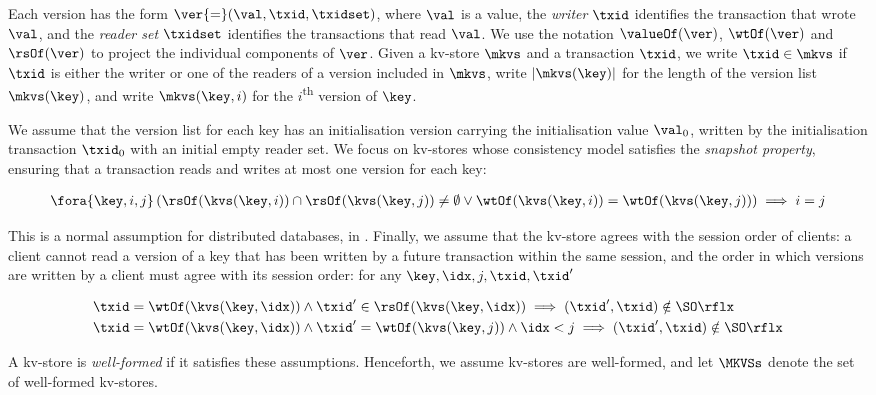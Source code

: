 Each version has the form 
\(\ver {=} (\val, \txid, \txidset)\), where \(\val\) is
a value, the \emph{writer} \(\txid\) identifies the transaction that
wrote \(\val\),  and the \emph{reader set} \(\txidset\) identifies the
transactions that read \(\val\). We use the notation 
\(\valueOf(\ver)\),
\(\wtOf(\ver)\) and \(\rsOf(\ver)\) to project
the individual components of \(\ver\).
Given a kv-store \(\mkvs\) and a transaction \(\txid\), we write 
\(\txid \in \mkvs\) if \(\txid\) is either the writer or 
one of the readers of a version included in \(\mkvs\), 
write \(\lvert \mkvs(\key) \rvert\) for the length of the version
list \(\mkvs(\key)\),
and write \(\mkvs(\key, i)\) for the \(i\)\textsuperscript{th} version of \(\key\).

We assume that the version list for each key has an initialisation version 
carrying the initialisation value \(\val_0\),  written by the 
initialisation transaction \(\txid_0\) with an initial empty reader set.
We focus on kv-stores whose consistency model satisfies the
\emph{snapshot property}, ensuring that
a transaction reads and writes at most one version for each key:

\SpaceAboveMath
\begin{align}
\fora{\key, i, j} 
\left( \rsOf(\kvs(\key, i)) \cap \rsOf(\kvs(\key, j)) \neq \emptyset \lor
\wtOf(\kvs(\key, i)) = \wtOf(\kvs(\key, j)) \right)
\implies i = j  
\label{equ:kvs-wf-txid-snapshot-property} 
\end{align}
\SpaceBelowMath

\noindent 
This is a normal assumption for distributed databases, \eg in \cite{ramp,rola,cops,wren,redblue,PSI,NMSI,gdur,clocksi,distrsi}.
Finally, we assume that the kv-store agrees with the session order of clients: 
a client cannot read a
version of a key that has been written by a future transaction within
the same session, and the order in which versions are written by a
client must agree with its session order:
for any \( \key,\idx,j,\txid,\txid' \)

\SpaceAboveMath
\begin{align}
& \txid = \wtOf(\kvs(\key,\idx))
\land \txid' \in \rsOf(\kvs(\key,\idx))
\implies (\txid', \txid) \notin \SO\rflx
\label{equ:kvs-wf-so-wr}
\\ & \txid = \wtOf(\kvs(\key,\idx))
\land \txid' = \wtOf(\kvs(\key,j))
\land \idx < j
\implies (\txid', \txid) \notin \SO\rflx
\label{equ:kvs-wf-so-ww}
\end{align}
\SpaceBelowMath

\noindent A kv-store is
\emph{well-formed} if it satisfies these assumptions.
Henceforth, we assume kv-stores are well-formed,
and let \(\MKVSs\) denote the set of well-formed kv-stores.

